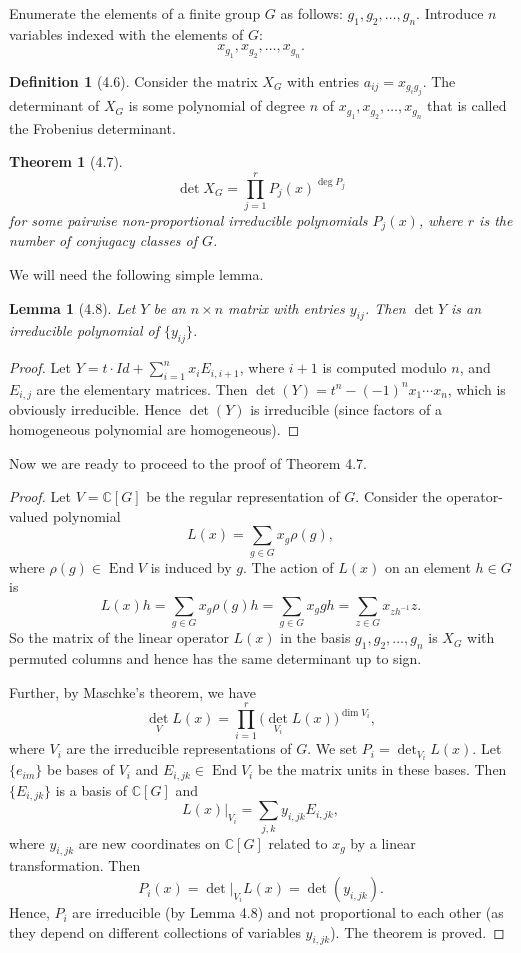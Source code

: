 \documentclass[UTF8,11pt]{ctexart}
\newtheorem*{theorem}{Theorem}
\newtheorem*{lemma}{Lemma}
\theoremstyle{definition}
\newtheorem*{definition}{Definition}
\newcommand{\C}{\mathbb C}
\begin{document}
Enumerate the elements of a finite group $G$ as follows: $g_1,g_2,\ldots,g_n$. Introduce $n$ variables indexed with the elements of $G$:
\[x_{g_1},x_{g_2},\ldots,x_{g_n}.\]
\begin{definition}[4.6]
Consider the matrix $X_G$ with entries $a_{ij}=x_{g_i g_j}$. The determinant of $X_G$ is some polynomial of degree $n$ of $x_{g_1},x_{g_2},\ldots,x_{g_n}$ that is called the Frobenius determinant.
\end{definition}
\begin{theorem}[4.7]
\[
\det X_G=\prod_{j=1}^r P_j(x)^{\deg P_j}
\]
for some pairwise non-proportional irreducible polynomials $P_j(x)$, where $r$ is the number of conjugacy classes of $G$.
\end{theorem}
We will need the following simple lemma.
\begin{lemma}[4.8]
Let $Y$ be an $n\times n$ matrix with entries $y_{ij}$. Then $\det Y$ is an irreducible polynomial of $\{y_{ij}\}$.
\end{lemma}
\begin{proof}
Let $Y=t\cdot Id+\sum_{i=1}^n x_i E_{i,i+1}$, where $i+1$ is computed modulo $n$, and $E_{i,j}$ are the elementary matrices. Then $\det(Y)=t^n-(-1)^n x_1\cdots x_n$, which is obviously irreducible. Hence $\det(Y)$ is irreducible (since factors of a homogeneous polynomial are homogeneous).
\end{proof}
Now we are ready to proceed to the proof of Theorem 4.7.
\begin{proof}
Let $V=\C[G]$ be the regular representation of $G$. Consider the operator-valued polynomial
\[L(x)=\sum_{g\in G}x_g\rho(g),\]
where $\rho(g)\in\operatorname{End}V$ is induced by $g$. The action of $L(x)$ on an element $h\in G$ is
\[
L(x)h=\sum_{g\in G}x_g\rho(g)h=\sum_{g\in G}x_g gh
=\sum_{z\in G}x_{zh^{-1}}z.
\]
So the matrix of the linear operator $L(x)$ in the basis $g_1,g_2,\ldots,g_n$ is $X_G$ with permuted columns and hence has the same determinant up to sign.

Further, by Maschke's theorem, we have
\[\det_V L(x)=\prod_{i=1}^r\bigl(\det_{V_i}L(x)\bigr)^{\dim V_i},\]
where $V_i$ are the irreducible representations of $G$. We set $P_i=\det_{V_i}L(x)$. Let $\{e_{im}\}$ be bases of $V_i$ and $E_{i,jk}\in\operatorname{End}V_i$ be the matrix units in these bases. Then $\{E_{i,jk}\}$ is a basis of $\C[G]$ and
\[L(x)|_{V_i}=\sum_{j,k}y_{i,jk}E_{i,jk},\]
where $y_{i,jk}$ are new coordinates on $\C[G]$ related to $x_g$ by a linear transformation. Then
\[P_i(x)=\det|_{V_i}L(x)=\det(y_{i,jk}).\]
Hence, $P_i$ are irreducible (by Lemma 4.8) and not proportional to each other (as they depend on different collections of variables $y_{i,jk}$). The theorem is proved.
\end{proof}
\end{document}
